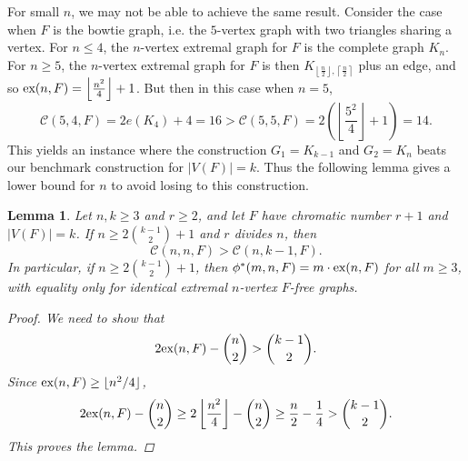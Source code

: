 \documentclass[12pt]{article}
\newtheorem{lemma}[theorem]{Lemma}
\newtheorem{corollary}[theorem]{Corollary}
\newcommand*{\ex}{\textnormal{ex}}
\newcommand*{\con}{\mathcal{C}}
\begin{document}



For small $n$, we may not be able to achieve the same result. Consider the case when $F$ is the bowtie graph, i.e. the $5$-vertex graph with two triangles sharing a vertex. For $n \leq 4$, the $n$-vertex extremal graph for $F$ is the complete graph $K_n$. For $n \geq 5$, the $n$-vertex extremal graph for $F$ is then $K_{\left\lfloor\frac{n}{2}\right\rfloor, \left\lceil\frac{n}{2}\right\rceil}$ plus an edge, and so $\ex(n, F) = \left\lfloor\frac{n^2}{4}\right\rfloor + 1$. But then in this case when $n = 5$, 
\[
  \con(5, 4, F) = 2e(K_4) + 4 = 16 > \con(5, 5, F) = 2\left(\left\lfloor\frac{5^2}{4}\right\rfloor + 1\right) = 14.
\]
This yields an instance where the construction $G_1 = K_{k - 1}$ and $G_2 = K_n$ beats our benchmark construction for $|V(F)| = k$. Thus the following lemma gives a lower bound for $n$ to avoid losing to this construction.

\begin{lemma}
  Let $n,k \geq 3$ and $r \geq 2$, and let $F$ have chromatic number $r + 1$ and $|V(F)| = k$. If $n \geq 2\binom{k-1}{2} + 1$ and $r$ divides $n$, then 
  \[
    \con(n, n, F) > \con(n, k - 1, F).
  \]
  In particular, if $n \geq 2\binom{k-1}{2} + 1$, 
  then $\phi^*(m,n,F) = m \cdot \ex(n,F)$ for all $m \geq 3$, with equality only for identical extremal $n$-vertex $F$-free graphs.
  \begin{proof}
    We need to show that
    \[
      2\ex(n, F) - \binom{n}{2} > \binom{k - 1}{2}.
    \]
    Since $\ex(n, F) \geq \lfloor n^2/4 \rfloor$,
    \[
      2\ex(n, F) - \binom{n}{2} \geq 2\left\lfloor \frac{n^2}{4}\right\rfloor  - \binom{n}{2} \geq \frac{n}{2} - \frac{1}{4} > \binom{k - 1}{2}.
    \]
    This proves the lemma.
  \end{proof}
\end{lemma}
\end{document}
